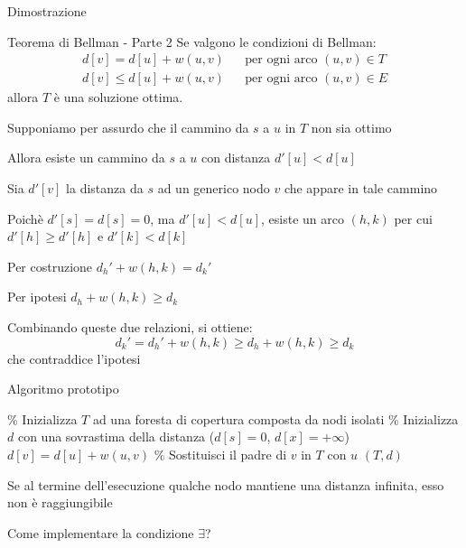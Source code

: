 \begin{frame}{Dimostrazione}

\begin{block}{Teorema di Bellman - Parte 2}
Se valgono le condizioni di Bellman:
\begin{align*} 
d[v] = d[u] + w(u,v) && \textrm{per ogni arco $(u,v) \in T$}\\
d[v] \leq d[u] + w(u,v) && \textrm{per ogni arco $(u,v) \in E$}
\end{align*}
allora $T$ è una soluzione ottima.
\end{block}

\begin{overprint}
\BI
\item Supponiamo per assurdo che il cammino da $s$ a $u$ in $T$ non sia ottimo
\item Allora esiste un cammino da $s$ a $u$ con distanza $d'[u]<d[u]$
\item Sia $d'[v]$ la distanza da $s$ ad un generico nodo $v$ che appare in
tale cammino
\item Poichè $d'[s] = d[s] = 0$, ma $d'[u]<d[u]$, esiste un arco $(h,k)$ 
per cui $d'[h] \geq d'[h]$ e $d'[k]< d[k]$
\EI
{}
\BI
\item Per costruzione $d_h' + w(h,k) = d_k'$
\item Per ipotesi $d_h + w(h,k) \ge d_k$
\item Combinando queste due relazioni, si ottiene: 
\[
  d_k' = d_h' + w(h,k) \ge d_h + w(h,k) \ge d_k
\]
che contraddice l'ipotesi
\EI
\end{overprint}

\end{frame}

\begin{frame}{Algoritmo prototipo}

\vspace{-12pt}
\begin{Procedure}
\caption[A]{$(\INTARRAY, \INTARRAY)$ \shortestprototype($\Graph\ G,\ \Node\ s$)}

\% Inizializza $T$ ad una foresta di copertura composta da nodi isolati\;
\% Inizializza $d$ con una sovrastima della distanza ($d[s]=0$, $d[x] = +\infty$)\;
{
  $d[v] = d[u] + w(u,v)$\;
  \% Sostituisci il padre di $v$ in $T$ con $u$\;
}
\Return $(T,d)$
\end{Procedure}

\smallskip
{}
\BIL
\item Se al termine dell'esecuzione qualche nodo mantiene una distanza infinita, esso non è raggiungibile
\item Come implementare la condizione $\exists$?
\EIL
\end{frame}

